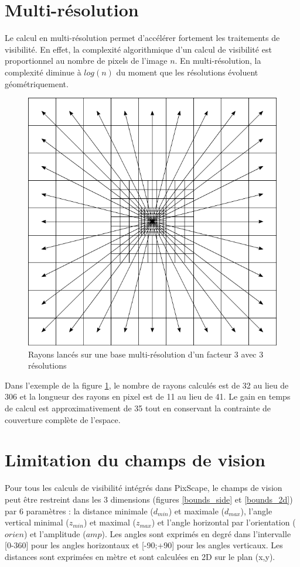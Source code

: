 \documentclass{report}
\begin{document}
\section{Multi-résolution}
\label{multires}
Le calcul en multi-résolution permet d'accélérer fortement les traitements de visibilité. En effet, la complexité algorithmique d'un calcul de visibilité est proportionnel au nombre de pixels de l'image $n$. En multi-résolution, la complexité diminue à $log(n)$ du moment que les résolutions évoluent géométriquement.

\begin{figure}[H]
	\includegraphics{img/grid_multi.pdf} 
	\caption{Rayons lancés sur une base multi-résolution d'un facteur 3 avec 3 résolutions}
	\label{grid_multi}
\end{figure}

Dans l'exemple de la figure \ref{grid_multi}, le nombre de rayons calculés est de 32 au lieu de 306 et la longueur des rayons en pixel est de 11 au lieu de 41. Le gain en temps de calcul est approximativement de 35 tout en conservant la contrainte de couverture complète de l'espace.


\section{Limitation du champs de vision}
\label{bounds}
Pour tous les calculs de visibilité intégrés dans PixScape, le champs de vision peut être restreint dans les 3 dimensions (figures \ref{bounds_side} et \ref{bounds_2d}) par 6 paramètres : la distance minimale ($d_{min}$) et maximale ($d_{max}$), l'angle vertical minimal ($z_{min}$) et maximal ($z_{max}$) et l'angle horizontal par l'orientation ($orien$) et l'amplitude ($amp$). Les angles sont exprimés en degré dans l'intervalle [0-360] pour les angles horizontaux et [-90;+90] pour les angles verticaux. Les distances sont exprimées en mètre et sont calculées en 2D sur le plan (x,y). 
\end{document}

